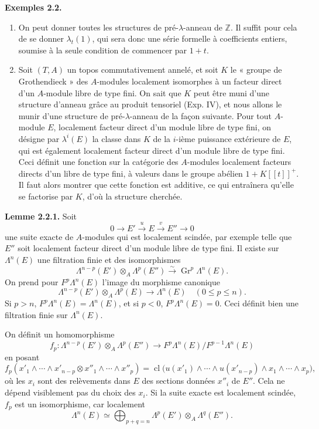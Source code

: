 \documentclass[11pt]{article}
\begin{document}
\textbf{Exemples 2.2.}
\begin{enumerate}[label=\alph*)]
\item On peut donner toutes les structures de pré-\(\lambda\)-anneau de \(\mathbb Z\). Il suffit pour cela de se donner \(\lambda_t(1)\), qui sera donc une série formelle à coefficients entiers, soumise à la seule condition de commencer par \(1+t\).

\item Soit \((T,A)\) un topos commutativement annelé, et soit \(K\) le « groupe de Grothendieck » des \(A\)-modules localement isomorphes à un facteur direct d'un \(A\)-module libre de type fini. On sait que \(K\) peut être muni d'une structure d'anneau grâce au produit tensoriel (Exp. IV), et nous allons le munir d'une structure de pré-\(\lambda\)-anneau de la façon suivante. Pour tout \(A\)-module \(E\), localement facteur direct d'un module libre de type fini, on désigne par \(\lambda^i(E)\) la classe dans \(K\) de la \(i\)-ième puissance extérieure de \(E\), qui est également localement facteur direct d'un module libre de type fini. Ceci définit une fonction sur la catégorie des \(A\)-modules localement facteurs directs d'un libre de type fini, à valeurs dans le groupe abélien \(1+K[[t]]^+\). Il faut alors montrer que cette fonction est additive, ce qui entraînera qu'elle se factorise par \(K\), d'où la structure cherchée.
\end{enumerate}

\textbf{Lemme 2.2.1.} Soit
\[
  0\longrightarrow E' \xrightarrow{u} E \xrightarrow{v} E''\longrightarrow0
\]
une suite exacte de \(A\)-modules qui est localement scindée, par exemple telle que \(E''\) soit localement facteur direct d'un module libre de type fini. Il existe sur \(\Lambda^n(E)\) une filtration finie et des isomorphismes
\[
  \Lambda^{n-p}(E')\otimes_A\Lambda^p(E'')
  \xrightarrow{\sim}
  \operatorname{Gr}^p\Lambda^n(E).
\]
On prend pour \(F^p\Lambda^n(E)\) l'image du morphisme canonique
\[
  \Lambda^{n-p}(E')\otimes_A\Lambda^p(E)\longrightarrow\Lambda^n(E)
  \quad (0\leq p\leq n).
\]
Si \(p>n\), \(F^p\Lambda^n(E)=\Lambda^n(E)\), et si \(p<0\), \(F^p\Lambda^n(E)=0\). Ceci définit bien une filtration finie sur \(\Lambda^n(E)\).

On définit un homomorphisme
\[
  f_p:\Lambda^{n-p}(E')\otimes_A\Lambda^p(E'')
  \longrightarrow F^p\Lambda^n(E)/F^{p-1}\Lambda^n(E)
\]
en posant
\[
  f_p(x'_1\wedge\cdots\wedge x'_{n-p}\otimes x''_1\wedge\cdots\wedge x''_p)
  =
  \operatorname{cl}\bigl(u(x'_1)\wedge\cdots\wedge u(x'_{n-p})\wedge x_1\wedge\cdots\wedge x_p\bigr),
\]
où les \(x_i\) sont des relèvements dans \(E\) des sections données \(x''_i\) de \(E''\). Cela ne dépend visiblement pas du choix des \(x_i\). Si la suite exacte est localement scindée, \(f_p\) est un isomorphisme, car localement
\[
  \Lambda^n(E)\simeq\bigoplus_{p+q=n}\Lambda^p(E')\otimes_A\Lambda^q(E'').
\]
\end{document}
